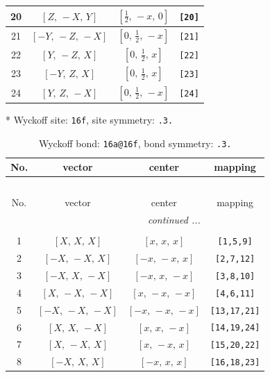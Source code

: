 \documentclass[fleqn,8pt]{jsarticle}
\begin{document}
\begin{longtable}{cccc}
20 & $\left[ Z,\, - X,\, Y \right]$ & $\left[ \frac{1}{2},\, - x,\, 0 \right]$ & {\tt [20]} \\ \hline
21 & $\left[ - Y,\, - Z,\, - X \right]$ & $\left[ 0,\, \frac{1}{2},\, - x \right]$ & {\tt [21]} \\ \hline
22 & $\left[ Y,\, - Z,\, X \right]$ & $\left[ 0,\, \frac{1}{2},\, x \right]$ & {\tt [22]} \\ \hline
23 & $\left[ - Y,\, Z,\, X \right]$ & $\left[ 0,\, \frac{1}{2},\, x \right]$ & {\tt [23]} \\ \hline
24 & $\left[ Y,\, Z,\, - X \right]$ & $\left[ 0,\, \frac{1}{2},\, - x \right]$ & {\tt [24]} \\
\end{longtable}
* Wyckoff site: {\tt 16f}, site symmetry: {\tt .3.}
\renewcommand{\arraystretch}{1.2}
\begin{longtable}{cccc}
\caption{Wyckoff bond: {\tt 16a@16f}, bond symmetry: {\tt .3.}}
 \\
 \hline \hline
No. & vector & center & mapping \\ \hline \endfirsthead

\multicolumn{3}{l}{\tablename\ \thetable{}} \\
 \hline \hline
No. & vector & center & mapping \\ \hline \endhead

 \hline \hline
\multicolumn{3}{r}{\footnotesize\it continued ...} \\ \endfoot

 \hline \hline
\multicolumn{3}{r}{} \\ \endlastfoot

1 & $\left[ X,\, X,\, X \right]$ & $\left[ x,\, x,\, x \right]$ & {\tt [1,5,9]} \\ \hline
2 & $\left[ - X,\, - X,\, X \right]$ & $\left[ - x,\, - x,\, x \right]$ & {\tt [2,7,12]} \\ \hline
3 & $\left[ - X,\, X,\, - X \right]$ & $\left[ - x,\, x,\, - x \right]$ & {\tt [3,8,10]} \\ \hline
4 & $\left[ X,\, - X,\, - X \right]$ & $\left[ x,\, - x,\, - x \right]$ & {\tt [4,6,11]} \\ \hline
5 & $\left[ - X,\, - X,\, - X \right]$ & $\left[ - x,\, - x,\, - x \right]$ & {\tt [13,17,21]} \\ \hline
6 & $\left[ X,\, X,\, - X \right]$ & $\left[ x,\, x,\, - x \right]$ & {\tt [14,19,24]} \\ \hline
7 & $\left[ X,\, - X,\, X \right]$ & $\left[ x,\, - x,\, x \right]$ & {\tt [15,20,22]} \\ \hline
8 & $\left[ - X,\, X,\, X \right]$ & $\left[ - x,\, x,\, x \right]$ & {\tt [16,18,23]} \\
\end{longtable}
\end{document}

